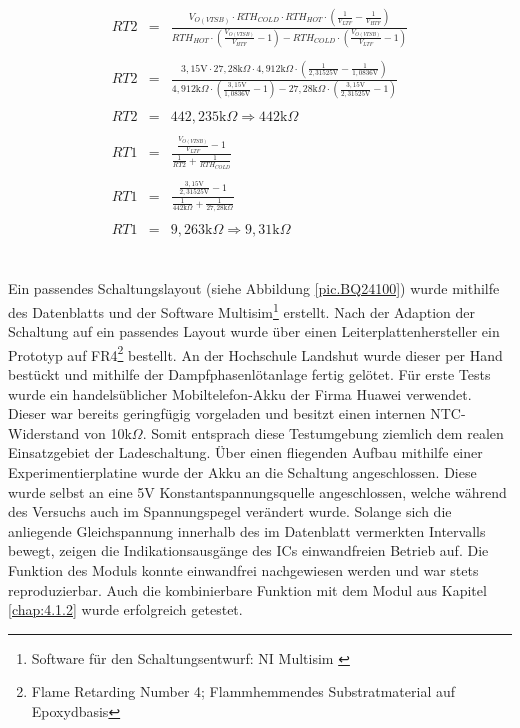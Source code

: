 \documentclass[12pt]{scrreprt} %
\begin{document}
\begin{eqnarray}
RT2&=&\frac{V_{O(VTSB)} \cdot RTH_{COLD} \cdot RTH_{HOT} \cdot \left( \frac{1}{V_{LTF}}-\frac{1}{V_{HTF}}\right)}{RTH_{HOT} \cdot \left( \frac{V_{O(VTSB)}}{V_{HTF}}-1\right)-RTH_{COLD} \cdot \left( \frac{V_{O(VTSB)}}{V_{LTF}}-1 \right)}\\
\nonumber\\
RT2&=&\frac{3,15\text{V} \cdot 27,28\text{k}\Omega \cdot4,912\text{k}\Omega \cdot \left( \frac{1}{2,31525\text{V}}-\frac{1}{1,0836\text{V}}\right)}{4,912\text{k}\Omega \cdot \left( \frac{3,15\text{V}}{1,0836\text{V}}-1\right)-27,28\text{k}\Omega \cdot \left( \frac{3,15\text{V}}{2,31525\text{V}}-1 \right)}\\
\nonumber\\
RT2&=& 442,235 \text{k} \Omega \Rightarrow 442\text{k} \Omega\\
\nonumber\\
RT1&=&\frac{\frac{V_{O(VTSB)}}{V_{LTF}}-1}{\frac{1}{RT2}+\frac{1}{RTH_{COLD}}}\\
\nonumber\\
RT1&=&\frac{\frac{3,15\text{V}}{2,31525\text{V}}-1}{\frac{1}{442\text{k} \Omega}+\frac{1}{27,28\text{k}\Omega}}\\
\nonumber\\
RT1&=&9,263\text{k}\Omega \Rightarrow 9,31\text{k}\Omega
\end{eqnarray}
\\
\\
Ein passendes Schaltungslayout (siehe Abbildung \vref{pic.BQ24100}) wurde mithilfe des Datenblatts \citep{BQ24100} und der Software Multisim\footnote{Software für den Schaltungsentwurf: NI Multisim \citep{MULTI}} erstellt. Nach der Adaption der Schaltung auf ein passendes Layout wurde über einen Leiterplattenhersteller ein Prototyp auf FR4\footnote{Flame Retarding Number 4; Flammhemmendes Substratmaterial auf Epoxydbasis} bestellt. An der Hochschule Landshut wurde dieser per Hand bestückt und mithilfe der Dampfphasenlötanlage fertig gelötet. Für erste Tests wurde ein handelsüblicher Mobiltelefon-Akku der Firma Huawei verwendet. Dieser war bereits geringfügig vorgeladen und besitzt einen internen NTC-Widerstand von 10k$\Omega$. Somit entsprach diese Testumgebung ziemlich dem realen Einsatzgebiet der Ladeschaltung. Über einen fliegenden Aufbau mithilfe einer Experimentierplatine wurde der Akku an die Schaltung angeschlossen. Diese wurde selbst an eine 5V Konstantspannungsquelle angeschlossen, welche während des Versuchs auch im Spannungspegel verändert wurde. Solange sich die anliegende Gleichspannung innerhalb des im Datenblatt vermerkten Intervalls bewegt, zeigen die Indikationsausgänge des ICs einwandfreien Betrieb auf. Die Funktion des Moduls konnte einwandfrei nachgewiesen werden und war stets reproduzierbar. Auch die kombinierbare Funktion mit dem Modul aus Kapitel \vref{chap:4.1.2} wurde erfolgreich getestet.
\end{document}
